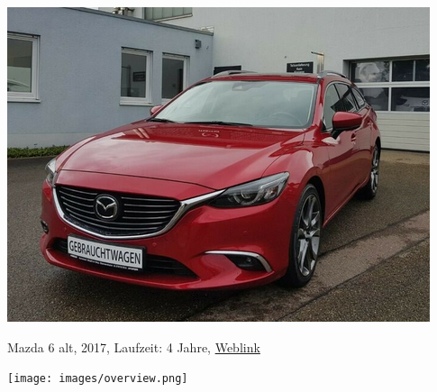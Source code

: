\documentclass[landscape, DIV=99, 14pt]{scrartcl}
\begin{document}
\pagebreak
\null
\vspace{2cm}
\begin{center}
\includegraphics[width=0.9\columnwidth]{cars/mazda-6-alt.png}

Mazda 6 alt, 2017, Laufzeit: 4 Jahre, \href{https://suchen.mobile.de/fahrzeuge/details.html?action=parkItem&id=332186075}{Weblink}
\end{center}

\pagebreak



\pagebreak

\onecolumn
\null
\vfill 
\begin{center}
\texttt{[image: images/overview.png]}
\end{center}
\vfill 
\end{document}
